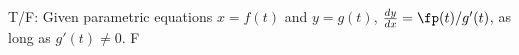 {T/F: Given parametric equations $x=f(t)$ and $y=g(t)$, $\frac{dy}{dx} = \fp(t)/g'(t)$, as long as $g'(t) \neq 0$. }
{F}
